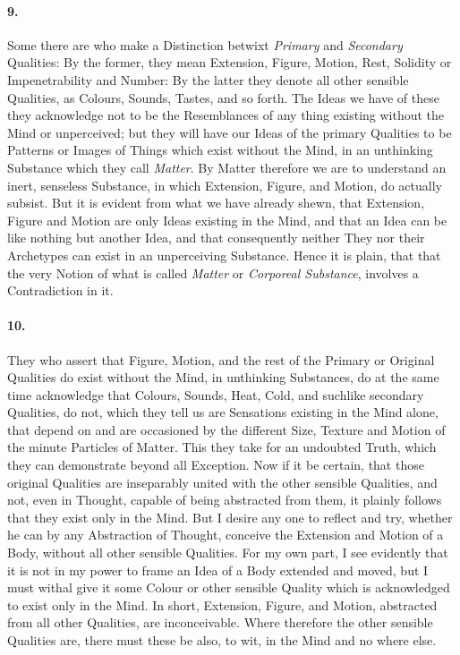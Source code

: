 \documentclass[]{article}
\newenvironment{sectionbody}{\begin{multicols}{2}}{\end{multicols}}
\begin{document}
\begin{sectionbody}
\paragraph{9.} Some there are who make a Distinction betwixt \emph{Primary}
and \emph{Secondary} Qualities: By the former, they mean
Extension, Figure, Motion, Rest, Solidity or Impenetrability and
Number: By the latter they denote all other sensible Qualities,
as Colours, Sounds, Tastes, and so forth.  The Ideas we have of
these they acknowledge not to be the Resemblances of any thing
existing without the Mind or unperceived; but they will have our
Ideas of the primary Qualities to be Patterns or Images of Things
which exist without the Mind, in an unthinking Substance which
they call \emph{Matter}.  By Matter therefore we are to
understand an inert, senseless Substance, in which Extension,
Figure, and Motion, do actually subsist.  But it is evident from
what we have already shewn, that Extension, Figure and Motion are
only Ideas existing in the Mind, and that an Idea can be like
nothing but another Idea, and that consequently neither They nor
their Archetypes can exist in an unperceiving Substance.  Hence
it is plain, that that the very Notion of what is called
\emph{Matter} or \emph{Corporeal Substance}, involves a
Contradiction in it.



\paragraph{10.} They who assert that Figure, Motion, and the rest of the Primary
or Original Qualities do exist without the Mind, in unthinking
Substances, do at the same time acknowledge that Colours, Sounds,
Heat, Cold, and suchlike secondary Qualities, do not, which they
tell us are Sensations existing in the Mind alone, that depend on
and are occasioned by the different Size, Texture and Motion of
the minute Particles of Matter.  This they take for an undoubted
Truth, which they can demonstrate beyond all Exception.  Now if
it be certain, that those original Qualities are inseparably
united with the other sensible Qualities, and not, even in
Thought, capable of being abstracted from them, it plainly
follows that they exist only in the Mind.  But I desire any one
to reflect and try, whether he can by any Abstraction of Thought,
conceive the Extension and Motion of a Body, without all other
sensible Qualities.  For my own part, I see evidently that it is
not in my power to frame an Idea of a Body extended and moved,
but I must withal give it some Colour or other sensible Quality
which is acknowledged to exist only in the Mind.  In short,
Extension, Figure, and Motion, abstracted from all other
Qualities, are inconceivable.  Where therefore the other sensible
Qualities are, there must these be also, to wit, in the Mind and
no where else.




\end{sectionbody}
\end{document}
